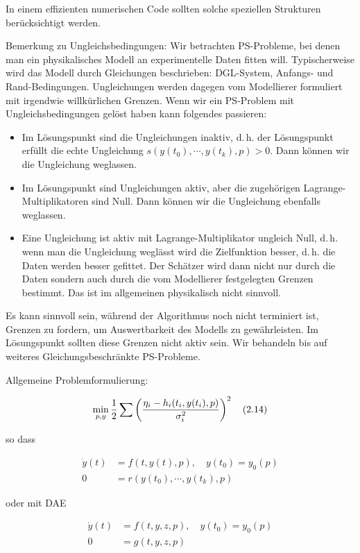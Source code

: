 In einem effizienten numerischen Code sollten solche speziellen Strukturen berücksichtigt werden.



Bemerkung zu Ungleichsbedingungen: Wir betrachten PS-Probleme, bei denen man ein physikalisches Modell an experimentelle Daten fitten will. Typischerweise wird das Modell durch Gleichungen beschrieben: DGL-System, Anfangs- und Rand-Bedingungen. Ungleichungen werden dagegen vom Modellierer formuliert mit irgendwie willkürlichen Grenzen. Wenn wir ein PS-Problem mit Ungleichsbedingungen gelöst haben kann folgendes passieren:

\begin{itemize}
\item Im Lösungspunkt sind die Ungleichungen inaktiv, d.\,h. der Lösungspunkt erfüllt die echte Ungleichung $s(y(t_0), \cdots, y(t_k), p) > 0$. Dann können wir die Ungleichung weglassen.
\item Im Lösungspunkt sind Ungleichungen aktiv, aber die zugehörigen Lagrange-Multiplikatoren sind Null. Dann können wir die Ungleichung ebenfalls weglassen.
\item Eine Ungleichung ist aktiv mit Lagrange-Multiplikator ungleich Null, d.\,h. wenn man die Ungleichung weglässt wird die Zielfunktion besser, d.\,h. die Daten werden besser gefittet. Der Schätzer wird dann nicht nur durch die Daten sondern auch durch die vom Modellierer festgelegten Grenzen bestimmt. Das ist im allgemeinen physikalisch nicht sinnvoll.
\end{itemize}

Es kann sinnvoll sein, während der Algorithmus noch nicht terminiert ist, Grenzen zu fordern, um Auswertbarkeit des Modells zu gewährleisten. Im Lösungspunkt sollten diese Grenzen nicht aktiv sein. Wir behandeln bis auf weiteres Gleichungsbeschränkte PS-Probleme.

Allgemeine Problemformulierung:

\[ \min_{p,y} \frac 12 \sum \left( \frac{\eta_i - h_i(t_i,y(t_i),p)}{\sigma_i^2} \right)^2 \quad (2.14)\]

so dass

\begin{align*}
\dot y(t) &= f(t,y(t),p), \quad y(t_0) = y_0(p) \\
0 &= r(y(t_0), \cdots, y(t_k), p)
\end{align*}

oder mit DAE

\begin{align*}
\dot y(t) &= f(t,y,z,p), \quad y(t_0) = y_0(p) \\
0 &= g(t,y,z,p) 
\end{align*}

